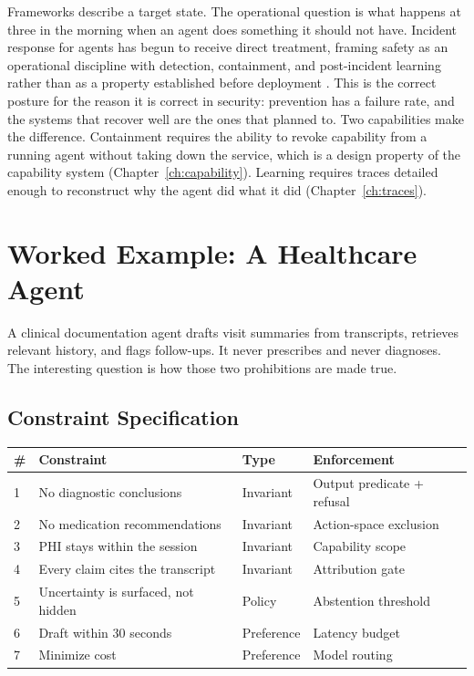\documentclass[11pt]{book}
\begin{document}
Frameworks describe a target state. The operational question is what happens at three in the morning when an agent does something it should not have. Incident response for agents has begun to receive direct treatment, framing safety as an operational discipline with detection, containment, and post-incident learning rather than as a property established before deployment \cite{air2026}. This is the correct posture for the reason it is correct in security: prevention has a failure rate, and the systems that recover well are the ones that planned to. Two capabilities make the difference. Containment requires the ability to revoke capability from a running agent without taking down the service, which is a design property of the capability system (Chapter~\ref{ch:capability}). Learning requires traces detailed enough to reconstruct why the agent did what it did (Chapter~\ref{ch:traces}).

\section{Worked Example: A Healthcare Agent}

A clinical documentation agent drafts visit summaries from transcripts, retrieves relevant history, and flags follow-ups. It never prescribes and never diagnoses. The interesting question is how those two prohibitions are made true.

\subsection{Constraint Specification}

\begin{center}
\begin{tabular}{llll}
\toprule
\# & Constraint & Type & Enforcement \\
\midrule
1 & No diagnostic conclusions & Invariant & Output predicate + refusal \\
2 & No medication recommendations & Invariant & Action-space exclusion \\
3 & PHI stays within the session & Invariant & Capability scope \\
4 & Every claim cites the transcript & Invariant & Attribution gate \\
5 & Uncertainty is surfaced, not hidden & Policy & Abstention threshold \\
6 & Draft within 30 seconds & Preference & Latency budget \\
7 & Minimize cost & Preference & Model routing \\
\bottomrule
\end{tabular}
\end{center}
\end{document}
